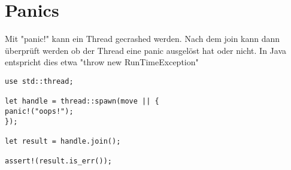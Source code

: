 \section{Panics}

Mit "panic!" kann ein Thread gecrashed werden.
Nach dem join kann dann überprüft werden ob der Thread eine panic ausgelöst hat oder nicht. In Java entspricht dies etwa "throw new RunTimeException"

\begin{lstlisting}
use std::thread;

let handle = thread::spawn(move || {
panic!("oops!");
});

let result = handle.join();

assert!(result.is_err());
\end{lstlisting}